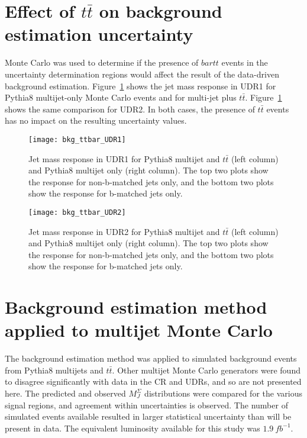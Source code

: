 \section{Effect of $t\bar{t}$ on background estimation uncertainty}\label{sec:bkg_ttbar}

Monte Carlo was used to determine if the presence of $bar{t}t$ events in the uncertainty determination regions would affect the result of the data-driven background estimation.
Figure~\ref{fig:ttbar_UDR1} shows the jet mass response in UDR1 for Pythia8 multijet-only Monte Carlo events and for multi-jet plus $t\bar{t}$.
Figure~\ref{fig:ttbar_UDR1} shows the same comparison for UDR2.
In both cases, the presence of $t\bar{t}$ events has no impact on the resulting uncertainty values.

\begin{figure}[!ht]
    \centering
    \texttt{[image: bkg\_ttbar\_UDR1]}
    \caption{Jet mass response in UDR1 for Pythia8 multijet and $t\bar{t}$ (left column) and Pythia8 multijet only (right column).
    The top two plots show the response for non-b-matched jets only, and the bottom two plots show the response for b-matched jets only.}
    \label{fig:ttbar_UDR1}
\end{figure}

\begin{figure}[!ht]
    \centering
    \texttt{[image: bkg\_ttbar\_UDR2]}
    \caption{Jet mass response in UDR2 for Pythia8 multijet and $t\bar{t}$ (left column) and Pythia8 multijet only (right column).
    The top two plots show the response for non-b-matched jets only, and the bottom two plots show the response for b-matched jets only.}

    \label{fig:ttbar_UDR2}
\end{figure}

\section{Background estimation method applied to multijet Monte Carlo}\label{sec:bkg_monte_carlo}

The background estimation method was applied to simulated background events from Pythia8 multijets and $t\bar{t}$.
Other multijet Monte Carlo generators were found to disagree significantly with data in the CR and UDRs, and so are not presented here.
The predicted and observed $M_{J}^{\Sigma}$ distributions were compared for the various signal regions, and agreement within uncertainties is observed.
The number of simulated events available resulted in larger statistical uncertainty than will be present in data.
The equivalent luminosity available for this study was $1.9~fb^{-1}$.

